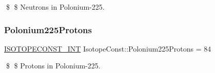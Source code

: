 \$ \$ Neutrons in Polonium-\/225. \mbox{\label{group___isotope_const-_polonium-_po225_ga2cb0171c4261886fc98ab849a0314a5b}} 
\subsubsection{\texorpdfstring{Polonium225\+Protons}{Polonium225Protons}}
{\footnotesize\ttfamily \mbox{\hyperlink{group___isotope_const-_macros_ga5f18360b3e99483a35c32d789e62621c}{I\+S\+O\+T\+O\+P\+E\+C\+O\+N\+S\+T\+\_\+\+I\+NT}} Isotope\+Const\+::\+Polonium225\+Protons = 84}

\$ \$ Protons in Polonium-\/225. 